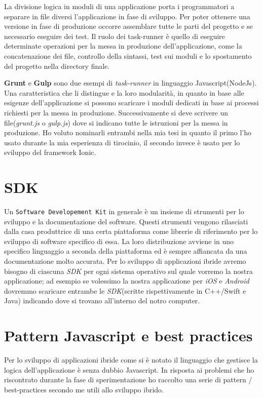 La divisione logica in moduli di una applicazione porta i programmatori a separare in file diversi l'applicazione in fase di sviluppo. Per poter ottenere una versione in fase di produzione occorre assemblare tutte le parti del progetto e se necessario eseguire dei test.
Il ruolo dei task-runner è quello di eseguire determinate operazioni per la messa in produzione dell'applicazione, come la concatenazione dei file, controllo della sintassi, test sui moduli e lo spostamento del progetto nella directory finale.

\textbf{Grunt} e \textbf{Gulp} sono due esempi di \emph{task-runner} in linguaggio Javascript(NodeJs). Una caratteristica che li distingue e la loro modularità, in quanto in base alle esigenze dell'applicazione si possono scaricare i moduli dedicati in base ai processi richiesti per la messa in produzione. Successivamente si deve scrivere un file(\textit{grunt.js} o \textit{gulp.js}) dove si indicano tutte le istruzioni per la messa in produzione. Ho voluto nominarli entrambi nella mia tesi in quanto il primo l'ho usato durante la mia esperienza di tirocinio, il secondo invece è usato per lo sviluppo del framework Ionic.


\section{SDK}
Un \texttt{Software Developement Kit} in generale è un insieme di strumenti per lo sviluppo e la documentazione del software\cite{wiki:sdk}. Questi strumenti vengono rilasciati dalla casa produttrice di una certa piattaforma come librerie di riferimento per lo sviluppo di software specifico di essa. La loro distribuzione avviene in uno specifico linguaggio a seconda della piattaforma ed è sempre affiancata da una documentazione molto accurata. 
Per lo sviluppo di applicazioni ibride avremo bisogno di ciascuna \emph{SDK} per ogni sistema operativo sul quale vorremo la nostra applicazione; ad esempio se volessimo la nostra applicazione per \emph{iOS} e \emph{Android} dovremmo scaricare entrambe le \emph{SDK}(scritte rispettivamente in C++/Swift e Java) indicando dove si trovano all'interno del notro computer.

\section{Pattern Javascript e best practices}
Per lo sviluppo di applicazioni ibride come si è notato il linguaggio che gestisce la logica dell'applicazione è senza dubbio Javascript. In risposta ai problemi che ho riscontrato durante la fase di sperimentazione ho raccolto una serie di pattern / best-practices secondo me utili allo sviluppo ibrido.
 
